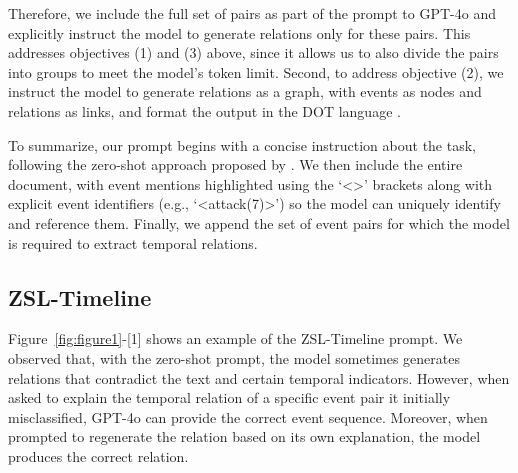 Therefore, we include the full set of pairs as part of the prompt to GPT-4o and explicitly instruct the model to generate relations only for these pairs. This addresses objectives (1) and (3) above, since it allows us to also divide the pairs into groups to meet the model's token limit. 
Second, to address objective (2), we instruct the model to generate relations as a graph, with events as nodes and relations as links, and format the output in the DOT language \cite{Gansner2006DrawingGW}. 

To summarize, our prompt begins with a concise instruction about the task, following the zero-shot approach proposed by \citet{yuan-etal-2023-zero}. We then include the entire document, with event mentions highlighted using the `<>' brackets along with explicit event identifiers (e.g., `<attack(7)>') so the model can uniquely identify and reference them. Finally, we append the set of event pairs for which the model is required to extract temporal relations.




\subsection{ZSL-Timeline}
\label{section:model:timeline}
Figure~\ref{fig:figure1}-[1] shows an example of the ZSL-Timeline prompt.
We observed that, with the zero-shot prompt, the model sometimes generates relations that contradict the text and certain temporal indicators. However, when asked to explain the temporal relation of a specific event pair it initially misclassified, GPT-4o can provide the correct event sequence. Moreover, when prompted to regenerate the relation based on its own explanation, the model produces the correct relation.  

